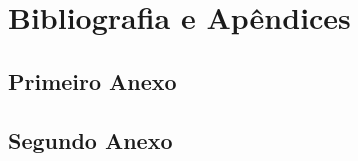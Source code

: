 \documentclass[portuguese]{ist-thesis}
\begin{document}
\lipsum %

\nocite{latex-companion, fontcatalogue, latexwiki, ctan, texsx}

\part{Bibliografia e Apêndices}

\printbibliography[heading = bibintoc]

\appendix

\chapter{Primeiro Anexo}

\lipsum

\chapter{Segundo Anexo}

\lipsum

\makespine
\end{document}
